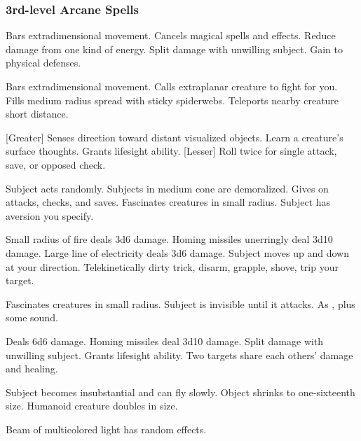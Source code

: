 \subsubsection{3rd-level Arcane Spells} 
\begin{swspelllist}
     Bars extradimensional movement.
     Cancels magical spells and effects.
     Reduce damage from one kind of energy.
     Split damage with unwilling subject.
     Gain  to physical defenses.

     Bars extradimensional movement.
     Calls extraplanar creature to fight for you.
     Fills medium radius spread with sticky spiderwebs.
     Teleports nearby creature short distance.

    [Greater] Senses direction toward distant visualized objects.
     Learn a creature's surface thoughts.
     Grants lifesight ability.
    [Lesser] Roll twice for single attack, save, or opposed check.

     Subject acts randomly.
     Subjects in medium cone are demoralized.
     Gives  on attacks, checks, and saves.
     Fascinates creatures in small radius.
     Subject has aversion you specify.

     Small radius of fire deals 3d6 damage.
     Homing missiles unerringly deal 3d10 damage.
     Large line of electricity deals 3d6 damage.
     Subject moves up and down at your direction.
     Telekinetically dirty trick, disarm, grapple, shove, trip your target.

     Fascinates creatures in small radius.
     Subject is invisible until it attacks.
     As , plus some sound.

     Deals 6d6 damage.
     Homing missiles deal 3d10 damage.
     Split damage with unwilling subject.
     Grants lifesight ability.
     Two targets share each others' damage and healing.

     Subject becomes insubstantial and can fly slowly.
     Object shrinks to one-sixteenth size.
     Humanoid creature doubles in size.

     Beam of multicolored light has random effects.
\end{swspelllist}

